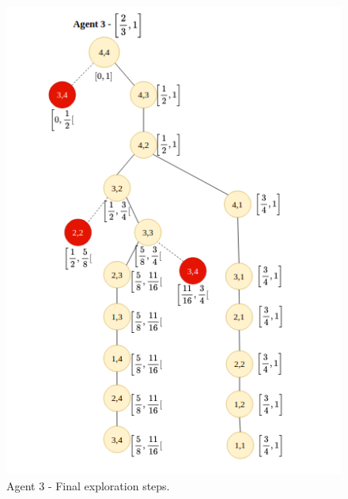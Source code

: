 \begin{figure}[H]
    \centering
    \includegraphics[width=1\textwidth]{ApeA/maze_agent_3_step_4.png}
    \caption{Agent 3 - Final exploration steps.}
    \label{fig_agent_3_step_4}
\end{figure}

